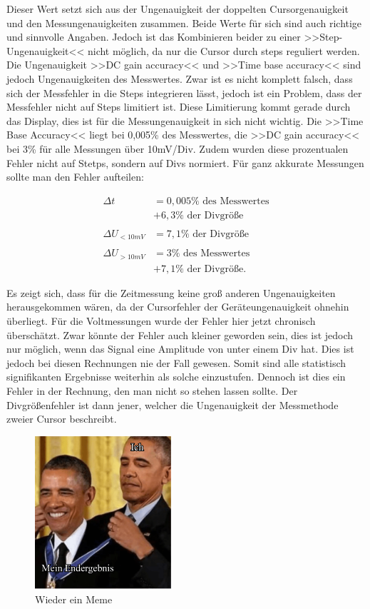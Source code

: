 Dieser Wert setzt sich aus der Ungenauigkeit der doppelten Cursorgenauigkeit und den Messungenauigkeiten zusammen.
Beide Werte für sich sind auch richtige und sinnvolle Angaben. 
Jedoch ist das Kombinieren beider zu einer >>Step-Ungenauigkeit<< nicht möglich, da nur die Cursor durch steps reguliert werden. Die Ungenauigkeit >>DC gain accuracy<< und >>Time base accuracy<< sind jedoch Ungenauigkeiten des Messwertes. 
Zwar ist es nicht komplett falsch, dass sich der Messfehler in die Steps integrieren lässt, jedoch ist ein Problem, dass der Messfehler nicht auf Steps limitiert ist. Diese Limitierung kommt gerade durch das Display, dies ist für die Messungenauigkeit in sich nicht wichtig.
Die >>Time Base Accuracy<< liegt bei 0,005\% des Messwertes, die >>DC gain accuracy<< bei 3\% für alle Messungen über 10mV/Div. Zudem wurden diese prozentualen Fehler nicht auf Stetps, sondern auf Divs normiert. Für ganz akkurate Messungen sollte man den Fehler aufteilen:

\begin{align*}
    \Delta t &= 0,005\% \text{ des Messwertes} \\
        &+ 6,3\% \text{ der Divgröße}\\
        \\
    \Delta U_{<10mV} &= 7,1\% \text{ der Divgröße} \\
    \\
    \Delta U_{>10mV} &= 3\% \text{ des Messwertes} \\
        &+ 7,1\% \text{ der Divgröße}.
\end{align*}



Es zeigt sich, dass für die Zeitmessung keine groß anderen Ungenauigkeiten herausgekommen wären, da der Cursorfehler der Geräteungenauigkeit ohnehin überliegt. Für die Voltmessungen wurde der Fehler hier jetzt chronisch überschätzt. Zwar könnte der Fehler auch kleiner geworden sein, dies ist jedoch nur möglich, wenn das Signal eine Amplitude von unter einem Div hat. Dies ist jedoch bei diesen Rechnungen nie der Fall gewesen. Somit sind alle statistisch signifikanten Ergebnisse weiterhin als solche einzustufen. Dennoch ist dies ein Fehler in der Rechnung, den man nicht so stehen lassen sollte. 
Der Divgrößenfehler ist dann jener, welcher die Ungenauigkeit der Messmethode zweier Cursor beschreibt.

\begin{figure}[!ht]
    \centering
    \includegraphics[width=0.45\textwidth]{img/25/memes/ergebnisse.pdf}
    \caption{Wieder ein Meme}
\end{figure}